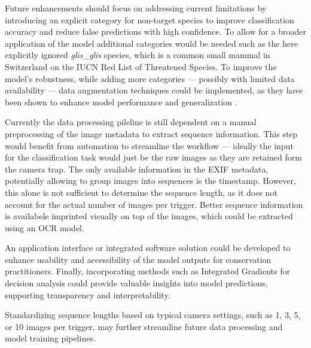 Future enhancements should focus on addressing current limitations by introducing an explicit category for non-target species to improve classification accuracy and reduce false predictions with high confidence.
To allow for a broader application of the model additional categories would be needed such as the here explicitly ignored \textit{glis\_glis} species, which is a common small mammal in Switzerland on the IUCN Red List of Threatened Species.
To improve the model's robustness, while adding more categories --- possibly with limited data availability --- data augmentation techniques could be implemented, as they have been shown to enhance model performance and generalization \autocite{shortenSurveyImageData2019}.

Currently the data processing pileline is still dependent on a manual preprocessing of the image metadata to extract sequence information.
This step would benefit from automation to streamline the workflow --- ideally the input for the classification task would just be the raw images as they are retained form the camera trap.
The only available information in the \ac{EXIF} metadata, potentially allowing to group images into sequences is the timestamp.
However, this alone is not sufficient to determine the sequence length, as it does not account for the actual number of images per trigger.
Better sequence information is availabele imprinted visually on top of the images, which could be extracted using an OCR model.

An application interface or integrated software solution could be developed to enhance usability and accessibility of the model outputs for conservation practitioners.
Finally, incorporating methods such as Integrated Gradients for decision analysis could provide valuable insights into model predictions, supporting transparency and interpretability.








Standardizing sequence lengths based on typical camera settings, such as 1, 3, 5, or 10 images per trigger, may further streamline future data processing and model training pipelines.






